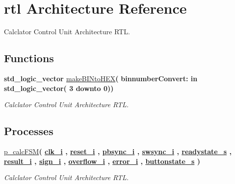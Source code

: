 \hypertarget{classcalc__ctrl_1_1rtl}{}\section{rtl Architecture Reference}
\label{classcalc__ctrl_1_1rtl}


Calclator Control Unit Architecture R\+TL.  


\subsection*{Functions}
 \begin{DoxyCompactItemize}
\item 
{\bfseries {\bfseries \textcolor{comment}{std\+\_\+logic\+\_\+vector}\textcolor{vhdlchar}{ }}} \hyperlink{classcalc__ctrl_1_1rtl_a3774820e8176f18c52166ea46fd6f731}{make\+B\+I\+Nto\+H\+EX}{\bfseries  ( }{\bfseries \textcolor{vhdlchar}{binnumber\+Convert\+: }\textcolor{stringliteral}{in }\textcolor{vhdlchar}{std\+\_\+logic\+\_\+vector( 3 downto  0)}}{\bfseries  )} 
\begin{DoxyCompactList}\small\item\em Calclator Control Unit Architecture R\+TL. \end{DoxyCompactList}\end{DoxyCompactItemize}
\subsection*{Processes}
 \begin{DoxyCompactItemize}
\item 
\hyperlink{classcalc__ctrl_1_1rtl_a40280aacdbe6c7a8f13c725ec3b5642d}{p\+\_\+calc\+F\+SM}{\bfseries  ( {\bfseries {\bfseries \hyperlink{classcalc__ctrl_abe949478e3f8aad0a6aeb1842fa6c608}{clk\+\_\+i}} \textcolor{vhdlchar}{ }} , {\bfseries {\bfseries \hyperlink{classcalc__ctrl_a55da7e76960757f8c6842e86a28ee7be}{reset\+\_\+i}} \textcolor{vhdlchar}{ }} , {\bfseries {\bfseries \hyperlink{classcalc__ctrl_ac9ed06cffb254d885992bb8fb780e8e6}{pbsync\+\_\+i}} \textcolor{vhdlchar}{ }} , {\bfseries {\bfseries \hyperlink{classcalc__ctrl_a8f274a58bd077b3f0604e897f5fd8d06}{swsync\+\_\+i}} \textcolor{vhdlchar}{ }} , {\bfseries {\bfseries \hyperlink{classcalc__ctrl_1_1rtl_a3e1f575cd6ec8066c23692c007e16457}{readystate\+\_\+s}} \textcolor{vhdlchar}{ }} , {\bfseries {\bfseries \hyperlink{classcalc__ctrl_a58aeef44e9161ee5cb7cc149ac8ee71a}{result\+\_\+i}} \textcolor{vhdlchar}{ }} , {\bfseries {\bfseries \hyperlink{classcalc__ctrl_a36cce5b89625a8867788d2fddddd19fd}{sign\+\_\+i}} \textcolor{vhdlchar}{ }} , {\bfseries {\bfseries \hyperlink{classcalc__ctrl_a3844e90f5dc89f02aa3b92d8ca978cfd}{overflow\+\_\+i}} \textcolor{vhdlchar}{ }} , {\bfseries {\bfseries \hyperlink{classcalc__ctrl_a43d5e6363af801d5112bf95b65cf682a}{error\+\_\+i}} \textcolor{vhdlchar}{ }} , {\bfseries {\bfseries \hyperlink{classcalc__ctrl_1_1rtl_af28493abe45f5efc5d9964a4858da804}{buttonstate\+\_\+s}} \textcolor{vhdlchar}{ }} )}
\begin{DoxyCompactList}\small\item\em Calclator Control Unit Architecture R\+TL. \end{DoxyCompactList}\end{DoxyCompactItemize}
